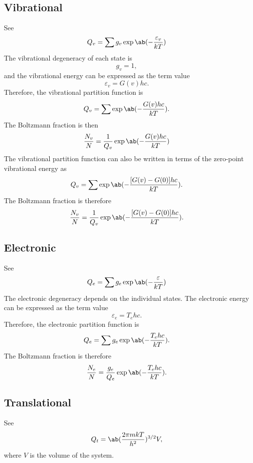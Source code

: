 \subsection{Vibrational}

See \cite[123]{herzbergMolecularSpectraMolecular1950}
\begin{equation*}
    Q_v = \sum g_v\exp\ab(-\frac{\varepsilon_v}{kT})
\end{equation*}
The vibrational degeneracy of each state is
\begin{equation*}
    g_v = 1,
\end{equation*}
and the vibrational energy can be expressed as the term value
\begin{equation*}
    \varepsilon_v = G(v)hc.
\end{equation*}
Therefore, the vibrational partition function is
\begin{equation*}
    Q_v = \sum \exp\ab(-\frac{G(v)hc}{kT}).
\end{equation*}
The Boltzmann fraction is then
\begin{equation*}
    \frac{N_v}{N} = \frac{1}{Q_v}\exp\ab(-\frac{G(v)hc}{kT})
\end{equation*}
The vibrational partition function can also be written in terms of the zero-point vibrational energy as
\begin{equation*}
    Q_v = \sum \exp\ab(-\frac{[G(v) - G(0)]hc}{kT}).
\end{equation*}
The Boltzmann fraction is therefore
\begin{equation*}
    \frac{N_v}{N} = \frac{1}{Q_v}\exp\ab(-\frac{[G(v) - G(0)]hc}{kT}).
\end{equation*}

\subsection{Electronic}

See \cite[544]{andersonHypersonicHighTemperatureGas2019}
\begin{equation*}
    Q_e = \sum g_e\exp\ab(-\frac{\varepsilon}{kT})
\end{equation*}
The electronic degeneracy depends on the individual states. The electronic energy can be expressed as the term value
\begin{equation*}
    \varepsilon_e = T_ehc.
\end{equation*}
Therefore, the electronic partition function is
\begin{equation*}
    Q_e = \sum g_e\exp\ab(-\frac{T_ehc}{kT}).
\end{equation*}
The Boltzmann fraction is therefore
\begin{equation*}
    \frac{N_e}{N} = \frac{g_e}{Q_e}\exp\ab(-\frac{T_ehc}{kT}).
\end{equation*}

\subsection{Translational}

See \cite[544]{andersonHypersonicHighTemperatureGas2019}
\begin{equation*}
    Q_t = \ab(\frac{2\pi mkT}{h^2})^{3/2}V,
\end{equation*}
where $V$ is the volume of the system.
